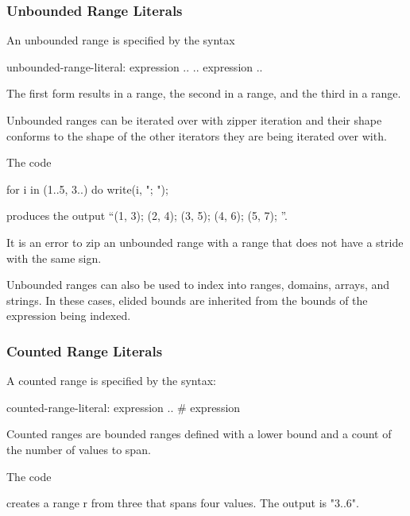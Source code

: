 \subsubsection{Unbounded Range Literals}
\label{Unbounded_Ranges}

An unbounded range is specified by the syntax
\begin{syntax}
unbounded-range-literal:
  expression ..
  .. expression
  ..
\end{syntax}

The first form results in a  range, the
second in a  range, and the third in
a  range.

Unbounded ranges can be iterated over with zipper iteration and their
shape conforms to the shape of the other iterators they are being
iterated over with.
\begin{example}
The code
\begin{chapel}
for i in (1..5, 3..) do
  write(i, "; ");
\end{chapel}
produces the output ``(1, 3); (2, 4); (3, 5); (4, 6); (5, 7); ''.
\end{example}

It is an error to zip an unbounded range with a range that does not
have a stride with the same sign.

Unbounded ranges can also be used to index into ranges, domains,
arrays, and strings.  In these cases, elided bounds are inherited
from the bounds of the expression being indexed.

\subsubsection{Counted Range Literals}
\label{Counted_Ranges}

A counted range is specified by the syntax:
\begin{syntax}
counted-range-literal:
  expression .. # expression
\end{syntax}

Counted ranges are bounded ranges defined with a lower bound and a count of the
number of values to span.

\begin{example}
The code
creates a range r from three that spans four values. The output is "3..6".
\end{example}


